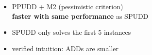\documentclass[12pt,svgnames,table]{beamer}
\begin{document}
\begin{frame}
\begin{minipage}{0.45\linewidth}
\end{minipage}
\begin{alertblock}{}
\centering
\begin{itemize}
\item PPUDD + M2 (pessimistic criterion)\\ 
\textbf{faster with same performance} as SPUDD
\item SPUDD only solves the first $5$ instances
\item verified intuition: ADDs are smaller
\end{itemize}
\end{alertblock}
\end{frame}
\end{document}
